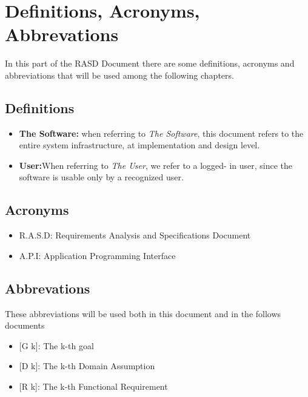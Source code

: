 \section{Definitions, Acronyms, Abbrevations}
In this part of the RASD Document there are some definitions, acronyms and abbreviations that will be used among the following chapters.
\subsection{Definitions}
\begin{itemize}
	\item \textbf{The Software:} when referring to \emph{The Software}, this document refers to the entire system infrastructure, at implementation and design level.

\item \textbf{User:}When referring to \emph{The User}, we refer to a logged- in user, since the software is usable only by a recognized user. 

	
	\end{itemize}
\subsection{Acronyms}

\begin{itemize}
  \item R.A.S.D: Requirements Analysis and Specifications Document
  \item A.P.I: Application Programming Interface 
\end{itemize}

\subsection{Abbrevations}
These abbreviations will be used both in this document and in the follows documents
\begin{itemize}
	\item {[}G k{]}: The k-th goal
    \item {[}D k{]}: The k-th Domain Assumption
    \item {[}R k{]}: The k-th Functional Requirement
\end{itemize}

